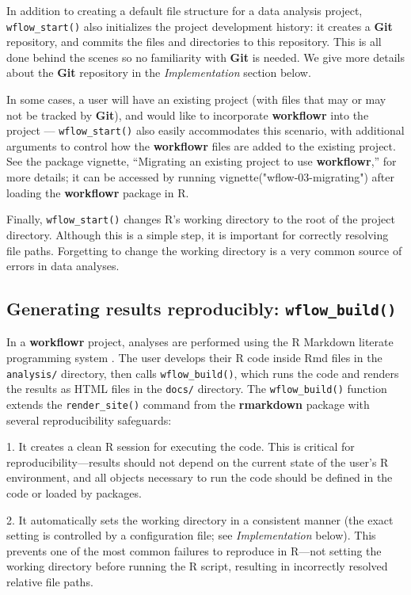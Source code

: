 \documentclass[9pt,a4paper]{extarticle}
\begin{document}
In addition to creating a default file structure for a data analysis
project, \texttt{wflow\_start()} also initializes the project development history:
it creates a \textbf{Git} repository, and commits the files and directories to
this repository. This is all done behind the scenes so no familiarity
with \textbf{Git} is needed. We give more details about the \textbf{Git} repository in the
\textit{Implementation} section below.

In some cases, a user will have an existing project (with files that may
or may not be tracked by \textbf{Git}), and would like to incorporate \textbf{workflowr}
into the project --- \texttt{wflow\_start()} also easily accommodates this
scenario, with additional arguments to control how the \textbf{workflowr} files
are added to the existing project. See the package vignette, ``Migrating
an existing project to use \textbf{workflowr},'' for more details; it can be
accessed by running vignette("wflow-03-migrating") after loading the
 \textbf{workflowr} package in R.

Finally, \texttt{wflow\_start()} changes R’s working directory to the root of the
project directory. Although this is a simple step, it is important for
correctly resolving file paths. Forgetting to change the working
directory is a very common source of errors in data analyses.

\subsection*{Generating results reproducibly: \texttt{wflow\_build()}}

In a \textbf{workflowr} project, analyses are performed using the R Markdown
literate programming system \cite{Xie2018}. The user develops their R
code inside Rmd files in the \texttt{analysis/} directory, then calls
\texttt{wflow\_build()}, which runs the code and renders the results as HTML files
in the \texttt{docs/} directory. The \texttt{wflow\_build()} function extends the
\texttt{render\_site()} command from the \textbf{rmarkdown} package with several
reproducibility safeguards:

1. It creates a clean R session for executing the code. This is critical
for reproducibility—results should not depend on the current state of
the user's R environment, and all objects necessary to run the code
should be defined in the code or loaded by packages.

2. It automatically sets the working directory in a consistent manner
(the exact setting is controlled by a configuration file; see
\textit{Implementation} below). This prevents one of the most common
failures to reproduce in R—not setting the working directory before
running the R script, resulting in incorrectly resolved relative file
paths.
\end{document}
